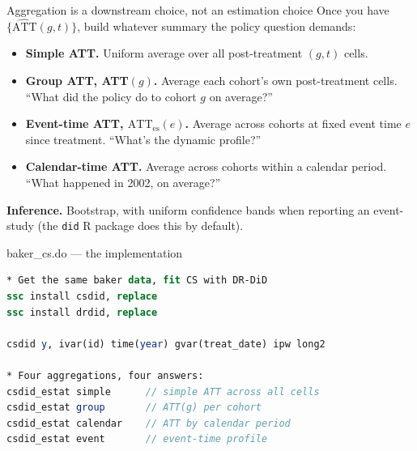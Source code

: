 \documentclass[aspectratio=169,11pt]{beamer}
\begin{document}
\begin{frame}{Aggregation is a downstream choice, not an estimation choice}
\vspace{0.5em}
Once you have $\{\widehat{\text{ATT}}(g,t)\}$, build whatever summary the policy question demands:

\vspace{0.5em}
\begin{itemize}\small
  \item \textbf{Simple ATT.} \;Uniform average over all post-treatment $(g,t)$ cells.
  \item \textbf{Group ATT, ATT$(g)$.} \;Average each cohort's own post-treatment cells. \;``What did the policy do to cohort $g$ on average?''
  \item \textbf{Event-time ATT, $\text{ATT}_{\text{es}}(e)$.} \;Average across cohorts at fixed event time $e$ since treatment. \;``What's the dynamic profile?''
  \item \textbf{Calendar-time ATT.} \;Average across cohorts within a calendar period. \;``What happened in 2002, on average?''
\end{itemize}

\vspace{0.5em}
\textbf{Inference.} \;Bootstrap, with uniform confidence bands when reporting an event-study (the \texttt{did} R package does this by default).
\end{frame}

\begin{frame}[fragile]{baker\_cs.do --- the implementation}
\begin{lstlisting}[language=Stata,basicstyle=\ttfamily\scriptsize]
* Get the same baker data, fit CS with DR-DiD
ssc install csdid, replace
ssc install drdid, replace

csdid y, ivar(id) time(year) gvar(treat_date) ipw long2

* Four aggregations, four answers:
csdid_estat simple      // simple ATT across all cells
csdid_estat group       // ATT(g) per cohort
csdid_estat calendar    // ATT by calendar period
csdid_estat event       // event-time profile
\end{lstlisting}

\vspace{0.5em}
\end{frame}
\end{document}
